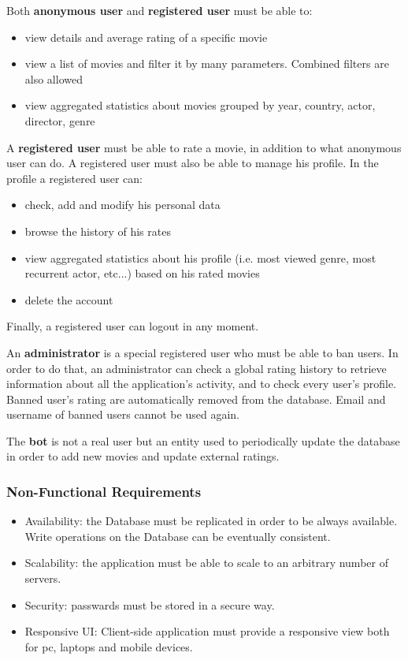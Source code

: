 \documentclass[10pt]{article}
\begin{document}
Both \textbf{anonymous user} and \textbf{registered user} must be able to:
\begin{itemize}
	\item view details and average rating of a specific movie
	\item view a list of movies and filter it by many parameters. Combined filters 
	are also allowed
	\item view aggregated statistics about movies grouped by year, country, actor,
	director, genre 
\end{itemize}

A \textbf{registered user} must be able to rate a movie, in addition to what anonymous
user can do. A registered user must also be able to manage his profile. In the profile a
registered user can:
\begin{itemize}
	\item check, add and modify his personal data
	\item browse the history of his rates
	\item view aggregated statistics about his profile (i.e. most viewed genre,
	most recurrent actor, etc...) based on his rated movies
	\item delete the account
\end{itemize}
Finally, a registered user can logout in any moment.

An \textbf{administrator} is a special registered user who must be able to ban users.
In order to do that, an administrator can check a global rating history to retrieve information
about all the application's activity, and to check every user's profile.
Banned user's rating are automatically removed from the database. Email and username
of banned users cannot be used again.

The \textbf{bot} is not a real user but an entity used to periodically update the database in order to add new movies and update external ratings. 

\subsubsection{Non-Functional Requirements}
\begin{itemize}
	\item Availability: the Database must be replicated in order to be always available.
	Write operations on the Database can be eventually consistent.
	\item Scalability: the application must be able to scale to an arbitrary number of servers.
	\item Security: passwards must be stored in a secure way.
	\item Responsive UI: Client-side application must provide a responsive view both for pc, 
	laptops and mobile devices.
\end{itemize}
\end{document}
